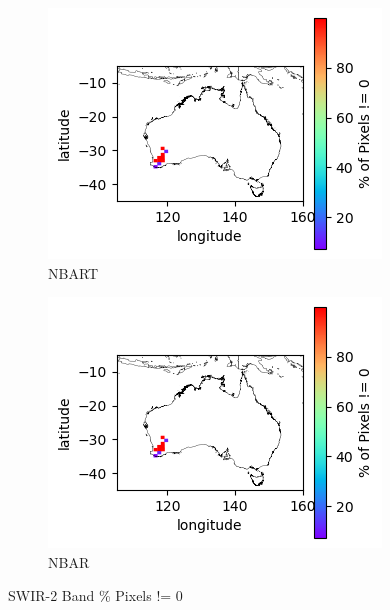 \documentclass[a4paper]{article}
\begin{document}
      \begin{figure}[h!]
        \centering
          \begin{subfigure}[l]{.4\linewidth}
            \hspace{-32mm}
            \includegraphics[scale=0.9]{plots/nbart/nbart_swir_2-PercentDifferent.png}
            \caption{NBART}
          \end{subfigure}
%
          \begin{subfigure}[r]{.4\linewidth}
            \includegraphics[scale=0.9]{plots/nbar/nbar_swir_2-PercentDifferent.png}
            \caption{NBAR}
          \end{subfigure}
        \caption{SWIR-2 Band \% Pixels != 0}\label{figure:32}
      \end{figure}

  \clearpage
\end{document}

